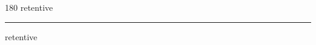 
\begin{frame}
\begin{center}
\begin{turn}{180}
{\fontsize{2.5cm}{1em}\selectfont retentive}
\end{turn}
\vspace{1em}\par  
\hrule
\vspace{1em}\par  
{\fontsize{2.5cm}{1em}\selectfont retentive}
\end{center}
\end{frame}
